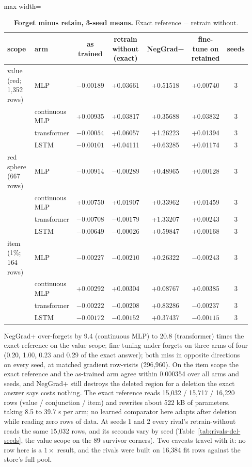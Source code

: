 \documentclass{article} %
\begin{document}
\begin{table}[h]
\centering\small
\caption{\textbf{Forget minus retain, 3-seed means.} Exact reference = retrain without.}
\label{tab:unlearn}
\setlength{\tabcolsep}{3pt}
\begin{adjustbox}{max width=\linewidth}\begin{tabular}{llccccc}
\toprule
scope & arm & as trained & retrain without (exact) & NegGrad+ & fine-tune on retained & seeds \\
\midrule
value (red; 1,352 rows) & MLP & $-0.00189$ & +0.03661 & +0.51518 & +0.00740 & 3 \\
 & continuous MLP & +0.00935 & +0.03817 & +0.35688 & +0.03832 & 3 \\
 & transformer & $-0.00054$ & +0.06057 & +1.26223 & +0.01394 & 3 \\
 & LSTM & $-0.00101$ & +0.04111 & +0.63285 & +0.01174 & 3 \\
red sphere (667 rows) & MLP & $-0.00914$ & $-0.00289$ & +0.48965 & +0.00128 & 3 \\
 & continuous MLP & +0.00750 & +0.01907 & +0.33962 & +0.01459 & 3 \\
 & transformer & $-0.00708$ & $-0.00179$ & +1.33207 & +0.00243 & 3 \\
 & LSTM & $-0.00649$ & $-0.00026$ & +0.59847 & +0.00168 & 3 \\
item (1\%; 164 rows) & MLP & $-0.00227$ & $-0.00210$ & +0.26322 & $-0.00243$ & 3 \\
 & continuous MLP & +0.00292 & +0.00304 & +0.08767 & +0.00385 & 3 \\
 & transformer & $-0.00222$ & $-0.00208$ & +0.83286 & $-0.00237$ & 3 \\
 & LSTM & $-0.00172$ & $-0.00152$ & +0.37437 & $-0.00115$ & 3 \\
\bottomrule
\end{tabular}\end{adjustbox}
\end{table}

\noindent NegGrad+ over-forgets by 9.4 (continuous MLP) to 20.8 (transformer) times the exact
reference on the value scope; fine-tuning under-forgets on three arms of four (0.20, 1.00, 0.23 and
0.29 of the exact answer); both miss in opposite directions on every seed, at matched gradient
row-visits (296,960). On the item scope the exact reference and the as-trained arm agree within
0.000354 over all arms and seeds, and NegGrad+ still destroys the deleted region for a deletion the
exact answer says costs nothing. The exact reference reads 15,032 / 15,717 / 16,220 rows (value /
conjunction / item) and rewrites about 522 kB of parameters, taking 8.5 to 39.7 s per arm; no learned
comparator here adapts after deletion while reading zero rows of data.
At seeds 1 and 2 every rival's retrain-without reads the same 15,032 rows, and its seconds vary by
seed (Table~\ref{tab:rivals-del-seeds}, the value scope on the 89 survivor corners). Two caveats
travel with it: no row here is a $1\times$ result, and the rivals were built on 16,384 fit rows
against the store's full pool.
\end{document}
